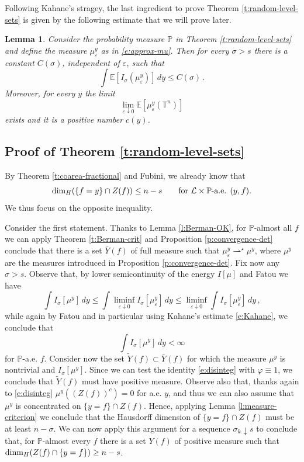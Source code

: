 \documentclass[11pt,reqno]{amsart}
\newtheorem{lemma}[theorem]{Lemma}
\theoremstyle{definition}
\numberwithin{equation}{section}
\begin{document}
Following Kahane's stragey, the last ingredient to prove Theorem \ref{t:random-level-sets} is given by the following estimate that we will prove later.

\begin{lemma}\label{l:Kahane}
Consider the probability measure $\mathbb P$ in Theorem \ref{t:random-level-sets} and define the measure $\mu^y_\varepsilon$ as in \eqref{e:approx-mu}. Then for every $\sigma >s$ there is a constant $C(\sigma)$, independent of $\varepsilon$, such that 
\begin{equation}\label{e:Kahane}
\int \mathbb E \left[I_\sigma (\mu^y_\varepsilon)\right]\, dy \leq C(\sigma)\, .
\end{equation}
Moreover, for every $y$ the limit
\begin{equation}\label{e:positive-limit}
\lim_{\varepsilon \downarrow 0} \mathbb E \left[\mu^y_\varepsilon (\mathbb T^n) \right]
\end{equation}
exists and it is a positive number $c(y)$. 
\end{lemma}

\subsection{Proof of Theorem \ref{t:random-level-sets}} By Theorem \ref{t:coarea-fractional} and Fubini, we already know that 
\[
{\rm dim}_H (\{f=y\}\cap Z(f)) \leq n-s \qquad \mbox{for $\mathcal{L} \times \mathbb P$-a.e. $(y,f)$.}
\]
We thus focus on the opposite inequality.

\medskip

Consider the first statement. Thanks to Lemma \ref{l:Berman-OK}, for $\mathbb P$-almost all $f$ we can apply Theorem \ref{t:Berman-crit} and Proposition \ref{p:convergence-det} conclude that there is a set $\bar{Y} (f)$ of full measure such that $\mu^y_\varepsilon \rightharpoonup^\star \mu^y$, where $\mu^y$ are the measures introduced in Proposition \ref{p:convergence-det}. Fix now any $\sigma>s$. Observe that, by lower semicontinuity of the energy $I [\mu]$ and Fatou we have 
\[
\int I_\sigma \left[\mu^y\right]\, dy
\leq \int \liminf_{\varepsilon\downarrow 0} I_\sigma \left[\mu^y_\varepsilon\right]\, dy
\leq \liminf_{\varepsilon\downarrow 0} \int I_\sigma \left[\mu^y_\varepsilon\right]\, dy\, ,
\]
while again by Fatou and in particular using Kahane's estimate \eqref{e:Kahane}, we conclude that 
\[
\int I_\sigma \left[\mu^y\right]\, dy < \infty
\]
for $\mathbb P$-a.e. $f$. Consider now the set $\tilde{Y} (f) \subset \bar{Y} (f)$ for which the measure $\mu^y$ is nontrivial and $I_\sigma [\mu^y]$. Since we can test the identity \eqref{e:disinteg} with $\varphi \equiv 1$, we conclude that $\tilde{Y} (f)$ must have positive measure. Observe also that, thanks again to \eqref{e:disinteg} $\mu^y ((Z(f))^c) =0$ for a.e. $y$, and thus we can also assume that $\mu^y$ is concentrated on $\{y=f\}\cap Z(f)$. Hence, applying Lemma \ref{l:measure-criterion} we conclude that the Hausdorff dimension of $\{y=f\}\cap Z(f)$ must be at least $n-\sigma$. We can now apply this argument for a sequence $\sigma_k\downarrow s$ to conclude that, for $\mathbb P$-almost every $f$ there is a set $Y(f)$ of positive measure such that ${\rm dinm}_H (Z(f)\cap \{y=f\})\geq n-s$.
\end{document}

